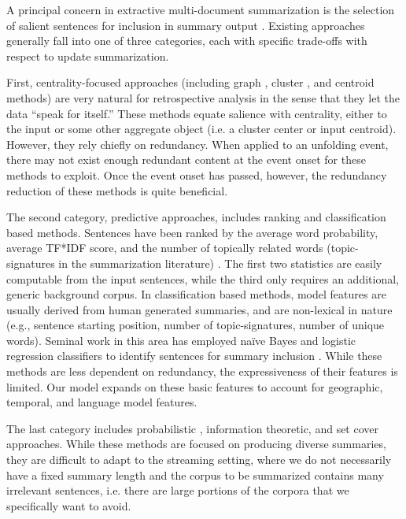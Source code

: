 \label{sec:relatedwork}

A principal concern in extractive multi-document summarization is the
selection of salient sentences for inclusion in summary output
\cite{nenkova2012survey}. 
Existing approaches generally fall into one of three categories, each with 
specific trade-offs with respect to update summarization. 


First, centrality-focused approaches (including graph \cite{erkan2004lexrank},
cluster \cite{hatzivassiloglou2001simfinder}, and centroid 
\cite{radev2004centroid} methods) are very natural for retrospective analysis 
in the sense that they let the data ``speak for itself.'' These methods 
equate salience with centrality, either to the input or some other aggregate 
object (i.e. a cluster center or input centroid). However, they rely
chiefly on redundancy. When applied to an unfolding event, there may not exist
enough redundant content at the event onset for these methods to exploit.
Once the event onset has passed, however, the redundancy reduction of these 
methods is quite beneficial.


The second category, predictive approaches, includes ranking and 
classification based methods. Sentences have been ranked by the average word 
probability, average TF*IDF score, and the number of topically related words 
(topic-signatures in the summarization literature)
\cite{nenkova2005impact,hovy1998automated,lin2000automated}. The first two
statistics are easily computable from the input sentences, while the third
only requires an additional, generic background corpus. In classification 
based methods, model features are usually derived from human generated 
summaries, and are non-lexical in nature (e.g., sentence starting position, 
number of topic-signatures, number of unique words). Seminal work in this 
area has employed na\"ive Bayes and logistic regression classifiers to 
identify sentences for summary inclusion 
\cite{kupiec1995trainable,conroy2001using}. 
While these methods are less dependent on redundancy, the expressiveness of
their features is limited. Our model expands on these basic features to 
account for geographic, temporal, and language model features.


The last category includes probabilistic \cite{haghighi2009exploring}, 
information theoretic, and set cover \cite{lin2011class}
approaches. While these methods are  focused on producing diverse
summaries, they are difficult to adapt to the streaming setting, where 
we do not necessarily have a fixed summary length and the corpus to be
summarized contains many irrelevant sentences, i.e. there are large
portions of the corpora that we specifically want to avoid. 


